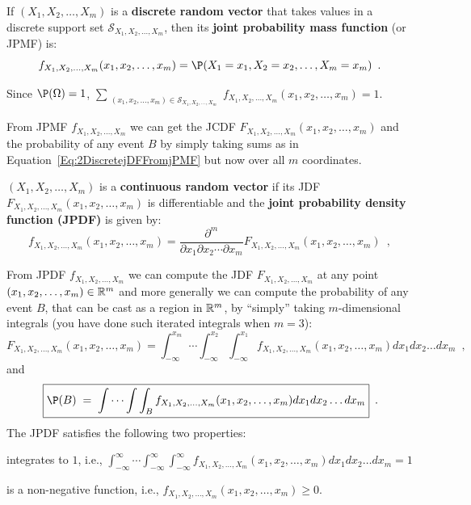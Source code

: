 \begin{definition}
If $(X_1,X_2,\ldots,X_m)$ is a {\bf discrete random vector} that takes values in a discrete support set $\mathcal{S}_{X_1,X_2,\ldots,X_m}$, then its \textbf{joint probability mass function} (or JPMF) is:
\begin{equation}\label{Eq:jmDPMF}
f_{X_1,X_2,\ldots,X_m}(x_1,x_2,\ldots,x_m) = \P(X_1=x_1,X_2=x_2,\ldots,X_m=x_m) \enspace . 
\end{equation}
\end{definition}
Since $\P(\Omega)=1$, $\sum_{{\substack{(x_1,x_2,\ldots,x_m) \in \mathcal{S}_{X_1,X_2,\ldots,X_m}}}}f_{X_1,X_2,\ldots,X_m}(x_1,x_2,\ldots,x_m)=1$.

From JPMF $f_{X_1,X_2,\ldots,X_m}$ we can get the JCDF $F_{X_1,X_2,\ldots,X_m}(x_1,x_2,\ldots,x_m)$ and the probability of any event $B$ by simply taking sums as in Equation~\eqref{Eq:2DiscretejDFFromjPMF} but now over all $m$ coordinates.

\begin{definition}
$(X_1,X_2,\ldots,X_m)$ is a {\bf continuous random vector} if its JDF $F_{X_1,X_2,\ldots,X_m}(x_1,x_2,\ldots,x_m)$ is differentiable and the {\bf joint probability density function (JPDF)} is given by:
\[
f_{X_1,X_2,\ldots,X_m}(x_1,x_2,\ldots,x_m) = \frac{\partial^m}{\partial x_1 \partial x_2 \cdots \partial x_m} F_{X_1,X_2,\ldots,X_m}(x_1,x_2,\ldots,x_m) \enspace ,
\]
\end{definition}

From JPDF $f_{X_1,X_2,\ldots,X_m}$ we can compute the JDF $F_{X_1,X_2,\ldots,X_m}$ at any point $(x_1,x_2,\ldots,x_m) \in \mathbb{R}^m$ and more generally we can compute the probability of any event $B$, that can be cast as a region in $\mathbb{R}^m$, by ``simply'' taking $m$-dimensional integrals (you have done such iterated integrals when $m=3$):
\begin{equation}\label{Eq:mContjDFFromjPDF}
\boxed{F_{X_1,X_2,\ldots,X_m}(x_1,x_2,\ldots,x_m) = \int_{-\infty}^{x_m} \cdots \int_{-\infty}^{x_2} \int_{-\infty}^{x_1} f_{X_1,X_2,\ldots,X_m}(x_1,x_2,\ldots,x_m) dx_1 dx_2\ldots d x_m}\enspace ,
\end{equation}
and
\begin{equation}\label{Eq:mContProbEventFromjPDF}
\boxed{\P(B)\;=\; \int\cdots\int\int_{B} f_{X_1,X_2,\ldots,X_m}(x_1,x_2,\ldots,x_m) dx_1 dx_2\ldots d x_m}\enspace .
\end{equation}
The JPDF satisfies the following two properties:
\be
\item integrates to $1$, i.e., $\int_{-\infty}^{\infty} \cdots \int_{-\infty}^{\infty}\int_{-\infty}^{\infty} f_{X_1,X_2,\ldots,X_m}(x_1,x_2,\ldots,x_m) dx_1 dx_2\ldots d x_m=1$
\item is a non-negative function, i.e., $f_{X_1,X_2,\ldots,X_m}(x_1,x_2,\ldots,x_m) \geq 0$.
\ee

